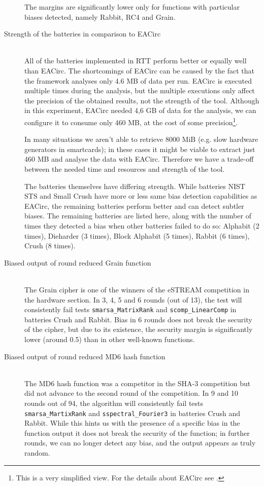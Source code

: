 \documentclass[
  digital,  	%
  color,		%
  oneside,   	%
  12pt,
  nocover,
  notable,
  nolof,
  nolot,
]{fithesis3}
\theoremstyle{definition}
\theoremstyle{remark}
\begin{document}
\begin{description}
The margins are significantly lower only for functions with particular biases detected, namely Rabbit, RC4 and Grain.

\item[Strength of the batteries in comparison to EACirc] \hfill \\
All of the batteries implemented in RTT perform better or equally well than EACirc. The shortcomings of EACirc can be caused by the fact that the framework analyses only 4.6 MB of data per run. EACirc is executed multiple times during the analysis, but the multiple executions only affect the precision of the obtained results, not the strength of the tool. Although in this experiment, EACirc needed 4,6 GB of data for the analysis, we can configure it to consume only 460 MB, at the cost of some precision\footnote{This is a very simplified view. For the details about EACirc see \cite{kubicek-dp}.}. 

In many situations we aren't able to retrieve 8000 MiB (e.g. slow hardware generators in smartcards); in these cases it might be viable to extract just 460 MB and analyse the data with EACirc. Therefore we have a trade-off between the needed time and resources and strength of the tool.

The batteries themselves have differing strength. While batteries NIST STS and Small Crush have more or less same bias detection capabilities as EACirc, the remaining batteries perform better and can detect subtler biases. The remaining batteries are listed here, along with the number of times they detected a bias when other batteries failed to do so: Alphabit (2 times), Dieharder (3 times), Block Alphabit (5 times), Rabbit (6 times), Crush (8 times).

\item[Biased output of round reduced Grain function] \hfill \\
The Grain cipher \cite{grain} is one of the winners of the eSTREAM competition in the hardware section. In 3, 4, 5 and 6 rounds (out of 13), the test will consistently fail tests \texttt{smarsa\_MatrixRank} and \texttt{scomp\_LinearComp} in batteries Crush and Rabbit.  Bias in 6 rounds does not break the security of the cipher, but due to its existence, the security margin is significantly lower (around 0.5) than in other well-known functions. 

\item[Biased output of round reduced MD6 hash function] \hfill \\
The MD6 hash function \cite{md6} was a competitor in the SHA-3 competition but did not advance to the second round of the competition. In 9 and 10 rounds out of 94, the algorithm will consistently fail tests \texttt{smarsa\_MartixRank} and \texttt{sspectral\_Fourier3} in batteries Crush and Rabbit. While this hints us with the presence of a specific bias in the function output it does not break the security of the function; in further rounds, we can no longer detect any bias, and the output appears as truly random.

\end{description}
\end{document}
